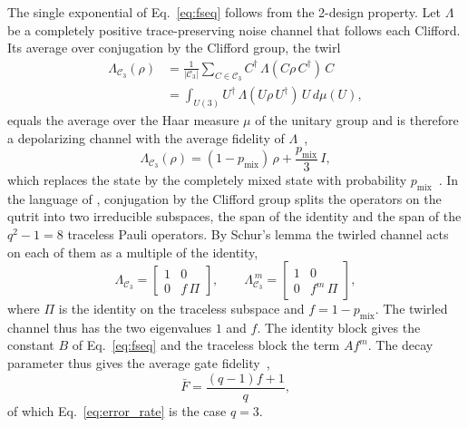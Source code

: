 The single exponential of Eq.~\eqref{eq:fseq} follows from the 2-design property. Let $\Lambda$ be a completely positive trace-preserving noise channel that follows each Clifford. Its average over conjugation by the Clifford group, the twirl
\begin{equation}
  \begin{split}
    \Lambda_{\mathcal{C}_3}(\rho)
    &= \frac{1}{|\mathcal{C}_3|}\sum_{C\in\mathcal{C}_3}
    C^\dagger\,\Lambda(C\rho\, C^\dagger)\,C \\
    &= \int_{U(3)} U^\dagger\,\Lambda(U\rho\, U^\dagger)\,U\,
    d\mu(U),
  \end{split}
\label{eq:clifford-twirl}
\end{equation}
equals the average over the Haar measure $\mu$ of the unitary group and is therefore a depolarizing channel with the average fidelity of $\Lambda$~\cite{Emerson2005,Dankert2009,Gross2007,Magesan2011PRL},
\begin{equation}
    \Lambda_{\mathcal{C}_3}(\rho) = (1-p_{\mathrm{mix}})\,\rho+\frac{p_{\mathrm{mix}}}{3}\,I ,
    \label{eq:1-depol}
\end{equation}
which replaces the state by the completely mixed state with probability $p_{\mathrm{mix}}$~\cite{NielsenChuang2010}. In the language of , conjugation by the Clifford group splits the operators on the qutrit into two irreducible subspaces, the span of the identity and the span of the $q^2 - 1 = 8$ traceless Pauli operators. By Schur's lemma the twirled channel acts on each of them as a multiple of the identity,
\begin{equation}
    \Lambda_{\mathcal{C}_3} =
    \begin{bmatrix}
    1 & 0 \\
    0 & f\,\Pi
    \end{bmatrix},
    \qquad
    \Lambda_{\mathcal{C}_3}^{\,m} =
    \begin{bmatrix}
    1 & 0 \\
    0 & f^{m}\,\Pi
    \end{bmatrix},
\label{eq:twirl_irrep}
\end{equation}
where $\Pi$ is the identity on the traceless subspace and $f = 1 - p_{\mathrm{mix}}$. The twirled channel thus has the two eigenvalues $1$ and $f$. The identity block gives the constant $B$ of Eq.~\eqref{eq:fseq} and the traceless block the term $A f^m$. %
The decay parameter thus gives the average gate fidelity~\cite{Nielsen2002,Magesan2012PRA},
\begin{equation}
\bar{F} = \frac{(q-1)f + 1}{q} ,
\label{eq:fbar}
\end{equation}
of which Eq.~\eqref{eq:error_rate} is the case $q = 3$.

